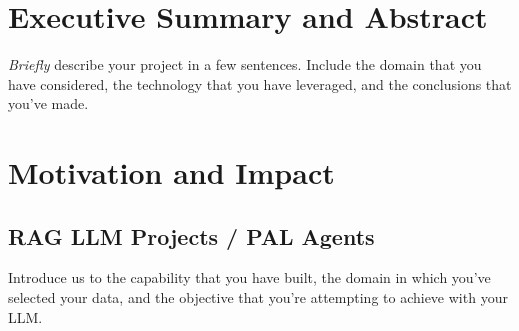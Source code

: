 \documentclass[paper=a4, fontsize=11pt]{scrartcl} %
\author{
    \textbf{NAME(S)} \\ 
    \href{http://www.google.com}{PROJECT GIT REPOSITORY}
}%
\begin{document}
\maketitle %

\section{Executive Summary and Abstract}

\emph{Briefly} describe your project in a few sentences. Include the domain that you have considered, the technology that you have leveraged, and the conclusions that you've made.

\section{Motivation and Impact}

\subsection{RAG LLM Projects / PAL Agents}
Introduce us to the capability that you have built, the domain in which you've selected your data, and the objective that you're attempting to achieve with your LLM. \\




\end{document}
